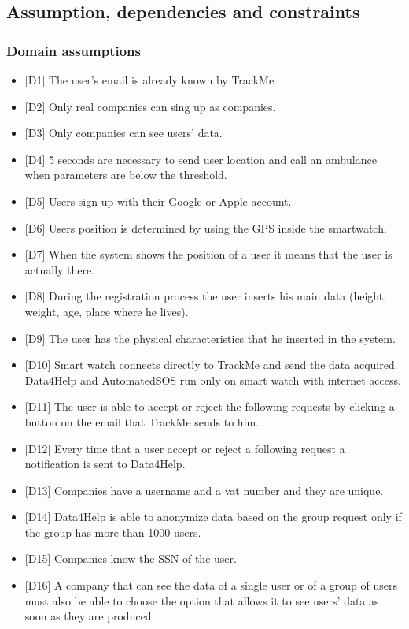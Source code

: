 \documentclass{article}
\begin{document}
\subsection{Assumption, dependencies and constraints}
\subsubsection{Domain assumptions}
\begin{itemize}
	\item {[D1]} The user's email is already known by TrackMe.
	\item {[D2]} Only real companies can sing up as companies.
	\item {[D3]} Only companies can see users' data.
	\item {[D4]} 5 seconds are necessary to send user location and call an ambulance when parameters are below the threshold.
	\item {[D5]} Users sign up with their Google or Apple account.
	\item {[D6]} Users position is determined by using the GPS inside the smartwatch.
	\item {[D7]} When the system shows the position of a user it means that the user is
actually there.
	\item {[D8]} During the registration process the user inserts his main data (height, weight, age, place where he lives).
	\item {[D9]} The user has the physical characteristics that he inserted in the system.
	\item {[D10]} Smart watch connects directly to TrackMe and send the data acquired. Data4Help and AutomatedSOS run only on smart watch with internet access.
	\item {[D11]} The user is able to accept or reject the following requests by clicking a button on the email that TrackMe sends to him.
	\item {[D12]} Every time that a user accept or reject a following request a notification is sent to Data4Help.
	\item {[D13]} Companies have a username and a vat number and they are unique.
	\item {[D14]} Data4Help is able to anonymize data based on the group request only if the group has more than 1000 users.
	\item {[D15]} Companies know the SSN of the user. 
	\item {[D16]} A company that can see the data of a single user or of a group of users must also be able to choose the option that allows it to see users' data as soon as they are produced.
\end{itemize}\newpage
\end{document}
